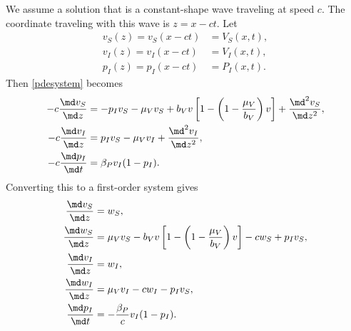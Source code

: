 \documentclass{jpmarticle}
\begin{document}
We assume a solution that is a constant-shape wave traveling at speed
$c$.  The coordinate traveling with this wave is $z = x - c t$.  Let
\begin{equation}
  \begin{split}
    v_S(z) = v_S(x - c t) &= V_S(x, t),
    \\
    v_I(z) = v_I(x - c t) &= V_I(x, t),
    \\
    p_I(z) = p_I(x - c t) &= P_I(x, t).
  \end{split}
\end{equation}
Then \eqref{pdesystem} becomes
\begin{equation}
  \label{nonlinearode}
  \begin{split}
    - c \frac{\md v_S}{\md z}
    &= - p_I v_S - \mu_V v_S
    + b_V v \left[1 - \left(1 - \frac{\mu_V}{b_V}\right) v\right]
    + \frac{\md^2 v_S}{\md z^2},
    \\
    - c \frac{\md v_I}{\md z}
    &= p_I v_S
    - \mu_V v_I
    + \frac{\md^2 v_I}{\md z^2},
    \\
    - c \frac{\md p_I}{\md t}
    &= \beta_P v_I (1 - p_I).
  \end{split}
\end{equation}
Converting this to a first-order system gives
\begin{equation}
  \label{nonlinearode}
  \begin{split}
    \frac{\md v_S}{\md z} &= w_S,
    \\
    \frac{\md w_S}{\md z}
    &= \mu_V v_S
    - b_V v \left[1 - \left(1 - \frac{\mu_V}{b_V}\right) v\right]
    - c w_S + p_I v_S,
    \\
    \frac{\md v_I}{\md z} &= w_I,
    \\
    \frac{\md w_I}{\md z}
    &= \mu_V v_I - c w_I - p_I v_S,
    \\
    \frac{\md p_I}{\md t}
    &= - \frac{\beta_P}{c} v_I (1 - p_I).
  \end{split}
\end{equation}
\end{document}
